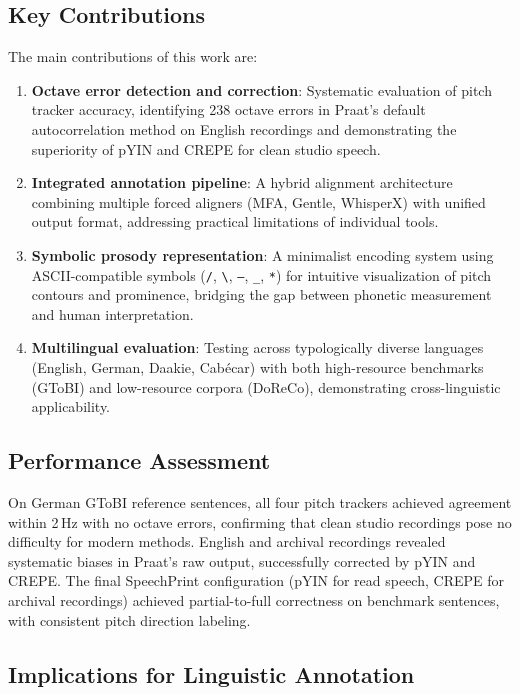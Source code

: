 \subsection{Key Contributions}

The main contributions of this work are:

\begin{enumerate}
\item \textbf{Octave error detection and correction}: Systematic evaluation of pitch tracker accuracy, identifying 238 octave errors in Praat's default autocorrelation method on English recordings and demonstrating the superiority of pYIN and CREPE for clean studio speech.

\item \textbf{Integrated annotation pipeline}: A hybrid alignment architecture combining multiple forced aligners (MFA, Gentle, WhisperX) with unified output format, addressing practical limitations of individual tools.

\item \textbf{Symbolic prosody representation}: A minimalist encoding system using ASCII-compatible symbols (\texttt{/}, \texttt{\textbackslash}, \texttt{–}, \texttt{\_}, \texttt{*}) for intuitive visualization of pitch contours and prominence, bridging the gap between phonetic measurement and human interpretation.

\item \textbf{Multilingual evaluation}: Testing across typologically diverse languages (English, German, Daakie, Cabécar) with both high-resource benchmarks (GToBI) and low-resource corpora (DoReCo), demonstrating cross-linguistic applicability.
\end{enumerate}

\subsection{Performance Assessment}

On German GToBI reference sentences, all four pitch trackers achieved agreement within 2\,Hz with no octave errors, confirming that clean studio recordings pose no difficulty for modern methods. English and archival recordings revealed systematic biases in Praat's raw output, successfully corrected by pYIN and CREPE. The final SpeechPrint configuration (pYIN for read speech, CREPE for archival recordings) achieved partial-to-full correctness on benchmark sentences, with consistent pitch direction labeling.

\subsection{Implications for Linguistic Annotation}

